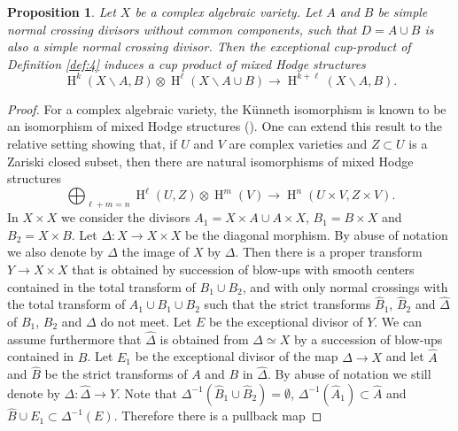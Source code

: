 \documentclass[11pt,a4paper]{amsart}
\DeclareMathOperator{\rH}{H}
\numberwithin{equation}{section}
\theoremstyle{plain}
\newtheorem{prop}{Proposition}[section]
\theoremstyle{definition}
\begin{document}
 \begin{prop}\label{prop:7}
  Let $X$ be a complex algebraic variety. Let $A$ and $B$ be simple normal crossing divisors without common components, such that $D=A\cup B$ is also a simple normal crossing divisor. Then the exceptional cup-product of
  Definition \ref{def:4} induces a cup product of
  mixed Hodge structures
  \begin{displaymath}
    \rH^{k}(X\smallsetminus A, B)\otimes
    \rH^{\ell}(X\smallsetminus A\cup B)
    \longrightarrow
        \rH^{k+\ell}(X\smallsetminus A, B).
      \end{displaymath}
\end{prop}
\begin{proof}
For a complex algebraic variety, the K\"unneth isomorphism is known to be an isomorphism of  mixed
Hodge structures (\cite[Theorem 5.44]{MHS}). One can extend this result
to the relative setting showing that, if $U$ and $V$ are complex
varieties and $Z\subset U$ is a Zariski closed subset, then there are
natural isomorphisms of mixed Hodge structures
\begin{displaymath}
  \bigoplus _{\ell+m=n}\rH^{\ell}(U,Z)\otimes \rH^{m}(V)
  \longrightarrow
  \rH^{n}(U\times V,Z\times V).
\end{displaymath}
In $X\times X$ we consider the divisors $A_{1}=X\times A\cup A\times
X$, $B_{1}=B\times X$ and $B_{2}=X\times B$. Let $\Delta\colon X\to
X\times X$ be the diagonal morphism. By abuse of notation we also
denote by $\Delta $ the image of $X$ by $\Delta $. Then there is a
proper transform $Y\to X\times X$ that is obtained by succession of blow-ups with
smooth centers contained in the total transform of
$B_{1}\cup B_{2}$, and with only normal crossings with the total
transform of $A_{1}\cup B_{1}\cup B_{2}$ such that the strict
transforms $\widehat B_{1}$, $\widehat
B_{2}$ and $\widehat \Delta $
of $B_{1}$, $B_{2}$ and $\Delta $ do not meet. Let $E$ be
the exceptional divisor  of $Y$.   We can assume furthermore that
$\widehat \Delta $ is obtained from $\Delta \simeq X$ by a succession of blow-ups
contained in $B$. Let $E_{1}$ be the exceptional divisor of the map
$\widehat \Delta \to X$ and let $\widehat A$ and $\widehat B$ be the
strict transforms of $A$ and $B$ in $\widehat \Delta $. By abuse of
notation we still denote by $\Delta \colon \widehat \Delta \to
Y$. Note that $\Delta ^{-1}(\widehat B_{1}\cup \widehat
B_{2})=\emptyset$, $\Delta ^{-1}(\widehat A_{1})\subset \widehat A$
and $ \widehat B\cup E_{1}\subset \Delta ^{-1}(E)$. Therefore there is
a pullback map

\end{proof}
\end{document}

